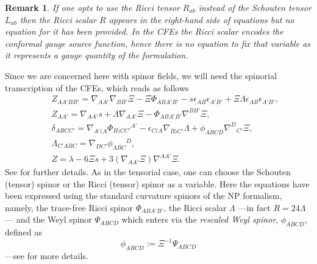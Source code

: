\documentclass[10pt,a4paper]{article}
\theoremstyle{plain}
\newtheorem{remark}{Remark}
\begin{document}
 \begin{remark}
   \emph{ If one opts to use the Ricci tensor $R_{ab}$ instead of the
     Schouten tensor $L_{ab}$ then the Ricci scalar $R$ appears in the
     right-hand side of equations but no equation for it has been
     provided.  In the CFEs the Ricci scalar encodes the
     \emph{conformal gauge source function}, hence there is no
     equation to fix that variable as it represents a gauge quantity
     of the formulation.}
 \end{remark}

\noindent Since we are concerned here with spinor fields, we will need
the spinorial transcription of the CFEs, which reads as follows
\begin{subequations}
\begin{eqnarray}
   && Z_{AA'BB'} = \nabla_{AA'}\nabla_{BB'}\Xi - \Xi \Phi _{ABA'B'} -
  s \epsilon _{AB} \epsilon _{A'B'} + \Xi \Lambda \epsilon _{AB}
  \epsilon _{A'B'} ,
  \label{Def_ConfFactor_CFE_zeroquant}\\
  && Z_{AA'} = \nabla_{AA'}s + \Lambda \nabla_{AA'}\Xi - \Phi
  _{ABA'B'} \nabla^{BB'}\Xi ,\label{Def_s_CFE_zeroquant}\\ &&
  \delta_{ABCC'} = \nabla_{A'(A}\Phi _{B)CC'}{}^{A'} - \epsilon _{C(A}
  \nabla_{B)C'}\Lambda + \phi _{ABCD} \nabla^{D}{}_{C'}\Xi
  ,\label{Def_delta_CFE_zeroquant} \\ && \Lambda _{C'ABC} =
  \nabla_{DC'}\phi _{ABC}{}^{D}, \label{Def_Lambda_CFE_zeroquant}\\ &&
  Z = \lambda -6 \Xi s + 3 (\nabla_{AA'}\Xi)
  \nabla^{AA'}\Xi. \label{Def_cons_CFE_zeroquant}
\end{eqnarray}
\end{subequations}
See \cite{CFEbook} for further details.  As in the tensorial case, one
can choose the Schouten (tensor) spinor or the Ricci (tensor) spinor
as a variable.  Here the equations have been expressed using the
standard curvature spinors of the NP formalism, namely, the trace-free
Ricci spinor $\Phi_{ABA'B'}$, the Ricci scalar $\Lambda$ ---in fact
$R= 24\Lambda$--- and the Weyl spinor $\Psi_{ABCD}$ which enters via
the \emph{rescaled Weyl spinor}, $\phi_{ABCD}$, defined as
\begin{equation}\label{Def_rescaled_Weyl_spinor}
\phi_{ABCD} := \Xi^{-1} \Psi_{ABCD}
\end{equation}
 ---see \cite{Ste91, PenRin84} for more details.
\end{document}
